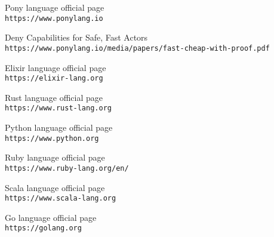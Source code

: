 \documentclass{article}
\begin{document}
\begin{thebibliography}{9}
Pony language official page
\\\texttt{https://www.ponylang.io}

Deny Capabilities for Safe, Fast Actors
\\\texttt{https://www.ponylang.io/media/papers/fast-cheap-with-proof.pdf}

Elixir language official page
\\\texttt{https://elixir-lang.org}

Rust language official page
\\\texttt{https://www.rust-lang.org}

Python language official page
\\\texttt{https://www.python.org}

Ruby language official page
\\\texttt{https://www.ruby-lang.org/en/}
	
Scala language official page
\\\texttt{https://www.scala-lang.org}

Go language official page
\\\texttt{https://golang.org}
	
	
\end{thebibliography}
\end{document}
